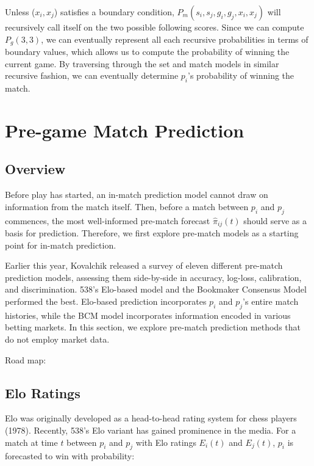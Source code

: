 \documentclass[chapterprefix=false]{report}
\begin{document}
Unless (${x}_i,{x}_j$) satisfies a boundary condition, $P_m(s_i,s_j,g_i,g_j,{x}_i,{x}_j)$ will recursively call itself on the two possible following scores. Since we can compute $P_g(3,3)$, we can eventually represent all each recursive probabilities in terms of boundary values, which allows us to compute the probability of winning the current game. By traversing through the set and match models in similar recursive fashion, we can eventually determine $p_i$'s probability of winning the match.  


\chapter{Pre-game Match Prediction}

\section{Overview}
Before play has started, an in-match prediction model cannot draw on information from the match itself. Then, before a match between $p_i$ and $p_j$ commences, the most well-informed pre-match forecast $\hat{\pi}_{ij}(t)$ should serve as a basis for prediction. Therefore, we first explore pre-match models as a starting point for in-match prediction.

Earlier this year, Kovalchik released a survey of eleven different pre-match prediction models, assessing them side-by-side in accuracy, log-loss, calibration, and discrimination. 538's Elo-based model and the Bookmaker Consensus Model performed the best. Elo-based prediction incorporates $p_i$ and $p_j$'s entire match histories, while the BCM model incorporates information encoded in various betting markets. In this section, we explore pre-match prediction methods that do not employ market data.

Road map:


\section{Elo Ratings}
Elo was originally developed as a head-to-head rating system for chess players (1978). Recently, 538's Elo variant has gained prominence in the media. For a match at time $t$ between $p_i$ and $p_j$ with Elo ratings $E_i(t)$ and $E_j(t)$, $p_i$ is forecasted to win with probability:
\end{document}
